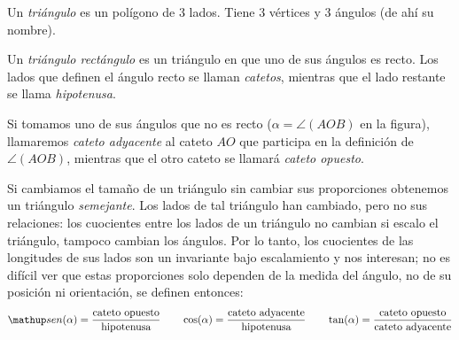Un \emph{triángulo} es un polígono de 3 lados.
Tiene 3 vértices y 3 ángulos (de ahí su nombre).

Un \emph{triángulo rectángulo} es un triángulo en que uno de sus ángulos es recto.
Los lados que definen el ángulo recto se llaman \emph{catetos}, mientras que el lado restante se llama \emph{hipotenusa}.

Si tomamos uno de sus ángulos que no es recto  ($\alpha=\angle(A O B)$ en la figura), llamaremos \emph{cateto adyacente} al cateto $AO$ que participa en la definición de $\angle(A O B)$, mientras que el otro cateto se llamará \emph{cateto opuesto}.

Si cambiamos el tamaño de un triángulo sin cambiar sus proporciones obtenemos un triángulo \emph{semejante}.
Los lados de tal triángulo han cambiado, pero no sus relaciones: los cuocientes entre los lados de un triángulo no cambian si escalo el triángulo, tampoco cambian los ángulos. 
Por lo tanto, los cuocientes de las longitudes de sus lados son un invariante bajo escalamiento y nos interesan; no es difícil ver que estas proporciones solo dependen de la medida del ángulo, no de su posición ni orientación,
se definen entonces:
\[
\sen(\alpha)=\frac{\textup{cateto opuesto}}{\textup{hipotenusa}}\qquad \cos(\alpha)=\frac{\textup{cateto adyacente}}{\textup{hipotenusa}}\qquad \tan(\alpha)=\frac{\textup{cateto opuesto}}{\textup{cateto adyacente}}
\]
\begin{center}
\end{center}

